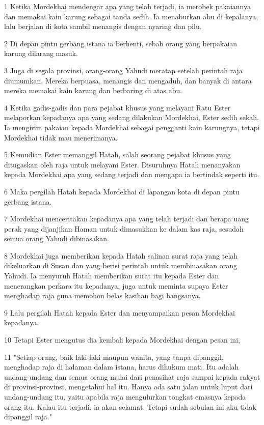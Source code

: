 \par 1 Ketika Mordekhai mendengar apa yang telah terjadi, ia merobek pakaiannya dan memakai kain karung sebagai tanda sedih. Ia menaburkan abu di kepalanya, lalu berjalan di kota sambil menangis dengan nyaring dan pilu.
\par 2 Di depan pintu gerbang istana ia berhenti, sebab orang yang berpakaian karung dilarang masuk.
\par 3 Juga di segala provinsi, orang-orang Yahudi meratap setelah perintah raja diumumkan. Mereka berpuasa, menangis dan mengaduh, dan banyak di antara mereka memakai kain karung dan berbaring di atas abu.
\par 4 Ketika gadis-gadis dan para pejabat khusus yang melayani Ratu Ester melaporkan kepadanya apa yang sedang dilakukan Mordekhai, Ester sedih sekali. Ia mengirim pakaian kepada Mordekhai sebagai pengganti kain karungnya, tetapi Mordekhai tidak mau menerimanya.
\par 5 Kemudian Ester memanggil Hatah, salah seorang pejabat khusus yang ditugaskan oleh raja untuk melayani Ester. Disuruhnya Hatah menanyakan kepada Mordekhai apa yang sedang terjadi dan mengapa ia bertindak seperti itu.
\par 6 Maka pergilah Hatah kepada Mordekhai di lapangan kota di depan pintu gerbang istana.
\par 7 Mordekhai menceritakan kepadanya apa yang telah terjadi dan berapa uang perak yang dijanjikan Haman untuk dimasukkan ke dalam kas raja, sesudah semua orang Yahudi dibinasakan.
\par 8 Mordekhai juga memberikan kepada Hatah salinan surat raja yang telah dikeluarkan di Susan dan yang berisi perintah untuk membinasakan orang Yahudi. Ia menyuruh Hatah memberikan surat itu kepada Ester dan menerangkan perkara itu kepadanya, juga untuk meminta supaya Ester menghadap raja guna memohon belas kasihan bagi bangsanya.
\par 9 Lalu pergilah Hatah kepada Ester dan menyampaikan pesan Mordekhai kepadanya.
\par 10 Tetapi Ester mengutus dia kembali kepada Mordekhai dengan pesan ini,
\par 11 "Setiap orang, baik laki-laki maupun wanita, yang tanpa dipanggil, menghadap raja di halaman dalam istana, harus dihukum mati. Itu adalah undang-undang dan semua orang mulai dari penasihat raja sampai kepada rakyat di provinsi-provinsi, mengetahui hal itu. Hanya ada satu jalan untuk luput dari undang-undang itu, yaitu apabila raja mengulurkan tongkat emasnya kepada orang itu. Kalau itu terjadi, ia akan selamat. Tetapi sudah sebulan ini aku tidak dipanggil raja."
